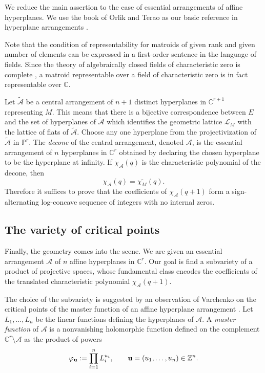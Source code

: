 \documentclass{compositio}
\theoremstyle{definition}
\theoremstyle{remark}
\begin{document}
We reduce the main assertion to the case of essential arrangements of affine hyperplanes.
We use the book of Orlik and Terao as our basic reference in hyperplane arrangements \cite{Orlik-Terao}.

Note that the condition of representability for matroids of given rank and given number of elements can be expressed in a first-order sentence in the language of fields.
Since the theory of algebraically closed fields of characteristic zero is complete \cite[Corollary 3.2.3]{Marker},
a matroid representable over a field of characteristic zero is in fact representable over $\mathbb{C}$.

Let $\widetilde{\mathcal{A}}$ be a central arrangement of $n+1$ distinct hyperplanes in $\mathbb{C}^{r+1}$ representing $M$. 
This means that there is a bijective correspondence between $E$ and the set of hyperplanes of $\widetilde{\mathcal{A}}$ which identifies the geometric lattice $\mathscr{L}_M$ with the lattice of flats of $\widetilde{\mathcal{A}}$.
Choose any one hyperplane from the projectivization of $\widetilde{\mathcal{A}}$ in $\mathbb{P}^r$. The \emph{decone} of the central arrangement, denoted $\mathcal{A}$, is the essential arrangement of $n$ hyperplanes in $\mathbb{C}^r$ obtained by declaring the chosen hyperplane to be the hyperplane at infinity.
If $\chi_{\mathcal{A}}(q)$ is the characteristic polynomial of the decone, then 
\[
\chi_{\mathcal{A}}(q)=\overline{\chi_M}(q).
\]
Therefore it suffices to prove that the coefficients of $\chi_\mathcal{A}(q+1)$ form a sign-alternating log-concave sequence of integers with no internal zeros.

\subsection{The variety of critical points}

Finally, the geometry comes into the scene. We are given an essential arrangement $\mathcal{A}$ of $n$ affine hyperplanes in $\mathbb{C}^r$. Our goal is find a subvariety of a product of projective spaces, whose fundamental class encodes the coefficients of the translated characteristic polynomial $\chi_\mathcal{A}(q+1)$. 

The choice of the subvariety is suggested by an observation of Varchenko on the critical points of the master function of an affine hyperplane arrangement \cite{Varchenko}. 
Let $L_1,\ldots,L_n$ be the linear functions defining the hyperplanes of $\mathcal{A}$. A \emph{master function} of $\mathcal{A}$ is a nonvanishing holomorphic function defined on the complement $\mathbb{C}^r \setminus \mathcal{A}$ as the product of powers
\[
\varphi_{\bf u}:=\prod_{i=1}^n L_i^{u_i}, \qquad \mathbf{u}=(u_1,\ldots,u_n) \in \mathbb{Z}^n.
\]
 
\end{document}
